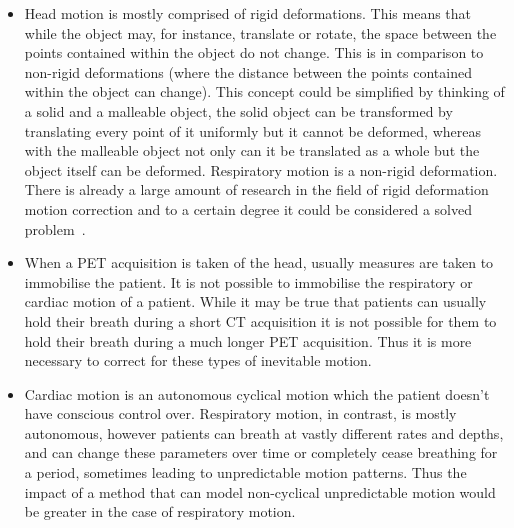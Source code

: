         \begin{itemize}
            \item Head motion is mostly comprised of rigid deformations. This means that while the object may, for instance, translate or rotate, the space between the points contained within the object do not change. This is in comparison to non-rigid deformations (where the distance between the points contained within the object can change). This concept could be simplified by thinking of a solid and a malleable object, the solid object can be transformed by translating every point of it uniformly but it cannot be deformed, whereas with the malleable object not only can it be translated as a whole but the object itself can be deformed. Respiratory motion is a non-rigid deformation. There is already a large amount of research in the field of rigid deformation motion correction and to a certain degree it could be considered a solved problem~\parencite{Hill2001}.
                
            \item When a \gls{PET} acquisition is taken of the head, usually measures are taken to immobilise the patient. It is not possible to immobilise the respiratory or cardiac motion of a patient. While it may be true that patients can usually hold their breath during a short \gls{CT} acquisition it is not possible for them to hold their breath during a much longer \gls{PET} acquisition. Thus it is more necessary to correct for these types of inevitable motion.
    
            \item Cardiac motion is an autonomous cyclical motion which the patient doesn't have conscious control over. Respiratory motion, in contrast, is mostly autonomous, however patients can breath at vastly different rates and depths, and can change these parameters over time or completely cease breathing for a period, sometimes leading to unpredictable motion patterns. %
            Thus the impact of a method that can model non-cyclical unpredictable motion would be greater in the case of respiratory motion.
        \end{itemize}
    
